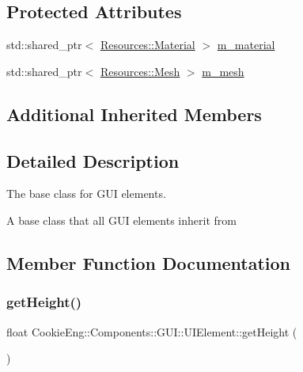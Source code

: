 \subsection*{Protected Attributes}
\begin{DoxyCompactItemize}
\item 
std\+::shared\+\_\+ptr$<$ \hyperlink{class_cookie_eng_1_1_resources_1_1_material}{Resources\+::\+Material} $>$ \hyperlink{class_cookie_eng_1_1_components_1_1_g_u_i_1_1_u_i_element_a954e279d79501fe6837c3f68c4acfcc0}{m\+\_\+material}
\item 
std\+::shared\+\_\+ptr$<$ \hyperlink{struct_cookie_eng_1_1_resources_1_1_mesh}{Resources\+::\+Mesh} $>$ \hyperlink{class_cookie_eng_1_1_components_1_1_g_u_i_1_1_u_i_element_ad6a0a678d69f7fc94de86d4a98af915c}{m\+\_\+mesh}
\end{DoxyCompactItemize}
\subsection*{Additional Inherited Members}


\subsection{Detailed Description}
The base class for G\+UI elements. 

A base class that all G\+UI elements inherit from 

\subsection{Member Function Documentation}
\mbox{\label{class_cookie_eng_1_1_components_1_1_g_u_i_1_1_u_i_element_a99062d7b0db29f366d7b16a63f83db6f}} 
\subsubsection{\texorpdfstring{get\+Height()}{getHeight()}}
{\footnotesize\ttfamily float Cookie\+Eng\+::\+Components\+::\+G\+U\+I\+::\+U\+I\+Element\+::get\+Height (\begin{DoxyParamCaption}{ }\end{DoxyParamCaption})\hspace{0.3cm}{\ttfamily [inline]}}



